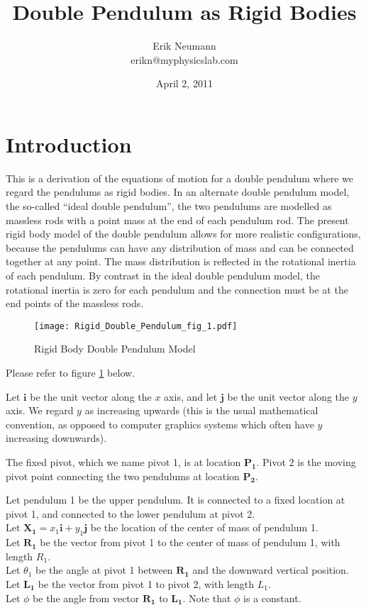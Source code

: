 \documentclass[draft]{article}
\title{Double Pendulum as Rigid Bodies}
\author{Erik Neumann\\
erikn@myphysicslab.com}
\date{April 2, 2011}
\begin{document}
\maketitle
\section{Introduction}

This is a derivation of the equations of motion for a double pendulum where we regard the pendulums as rigid bodies.  In an alternate double pendulum model, the so-called ``ideal double pendulum'', the two pendulums are modelled as massless rods with a point mass at the end of each pendulum rod.  The present rigid body model of the double pendulum allows for more realistic configurations, because the pendulums can have any distribution of mass and can be connected together at any point.  The mass distribution is reflected in the rotational inertia of each pendulum.  By contrast in the ideal double pendulum model, the rotational inertia is zero for each pendulum and the connection must be at the end points of the massless rods.

\begin{figure}
    \centering
    \texttt{[image: Rigid\_Double\_Pendulum\_fig\_1.pdf]}
    \caption{Rigid Body Double Pendulum Model} \label{fig_1}
\end{figure}

Please refer to figure \ref{fig_1} below.

Let $\mathbf{i}$ be the unit vector along the $x$ axis, and let $\mathbf{j}$ be the unit vector along the $y$ axis.  We regard $y$ as increasing upwards (this is the usual mathematical convention, as opposed to computer graphics systems which often have $y$ increasing downwards).  

The fixed pivot, which we name pivot 1, is at location $\mathbf{P_1}$.  Pivot 2 is the moving pivot point connecting the two pendulums at location $\mathbf{P_2}$.

Let pendulum 1 be the upper pendulum.  It is connected to a fixed location at pivot 1, and connected to the lower pendulum at pivot 2.\\
Let $\mathbf{X_1} = x_1 \mathbf{i} + y_1 \mathbf{j}$ be the location of the center of mass of pendulum 1.\\
Let $\mathbf{R_1}$ be the vector from pivot 1 to the center of mass of pendulum 1, with length $R_1$.\\
Let $\theta_1$ be the angle at pivot 1 between $\mathbf{R_1}$ and the downward vertical position.\\
Let $\mathbf{L_1}$ be the vector from pivot 1 to pivot 2, with length $L_1$.\\
Let $\phi$ be the angle from vector $\mathbf{R_1}$ to $\mathbf{L_1}$.  Note that $\phi$ is a constant.
\end{document}
